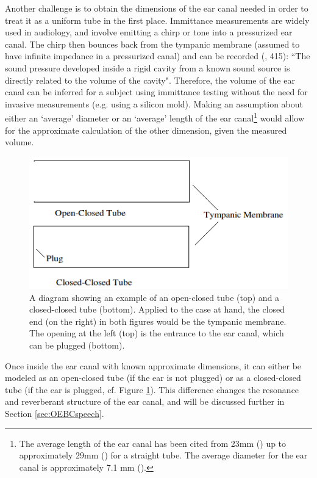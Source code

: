 \documentclass[dissertation,copyright]{uathesis}
\begin{document}
Another challenge is to obtain the dimensions of the ear canal needed in order to treat it as a uniform tube in the first place. Immittance measurements are widely used in audiology, and involve emitting a chirp or tone into a pressurized ear canal.  The chirp then bounces back from the tympanic membrane (assumed to have infinite impedance in a pressurized canal) and can be recorded (\cite{ballachanda:97}, 415): ``The sound pressure developed inside a rigid cavity from a known sound source is directly related to the volume of the cavity".  Therefore, the volume of the ear canal can be inferred for a subject using immittance testing without the need for invasive measurements (e.g. using a silicon mold).  Making an assumption about either an `average' diameter or an `average' length of the ear canal\footnote{The average length of the ear canal has been cited from 23mm (\cite{rosen:91}) up to approximately 29mm (\cite{stinson:89}) for a straight tube. The average diameter for the ear canal is approximately 7.1 mm (\cite{salvinelli:91}).}  would allow for the approximate calculation of the other dimension, given the measured volume. 

\begin{figure}[h]
\centering
  \includegraphics{figure/open-closed-tube.png}
  \caption{A diagram showing an example of an open-closed tube (top) and a closed-closed tube (bottom).  Applied to the case at hand, the closed end (on the right) in both figures would be the tympanic membrane.  The opening at the left (top) is the entrance to the ear canal, which can be plugged (bottom).}
  \label{fig:open-closed-tube}
\end{figure}

Once inside the ear canal with known approximate dimensions, it can either be modeled as an open-closed tube (if the ear is not plugged) or as a closed-closed tube (if the ear is plugged, cf. Figure \ref{fig:open-closed-tube}). This difference changes the resonance and reverberant structure of the ear canal, and will be discussed further in Section \ref{sec:OEBCspeech}.  
\end{document}
